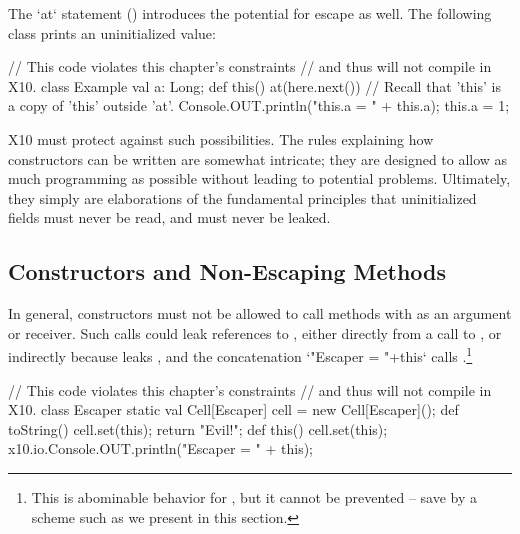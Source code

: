 The \xcd`at` statement () introduces the potential for
escape as well. The following class prints an uninitialized value: 
\begin{xten}
// This code violates this chapter's constraints
// and thus will not compile in X10.
class Example {
  val a: Long;
  def this() { 
    at(here.next()) {
      // Recall that 'this' is a copy of 'this' outside 'at'.
      Console.OUT.println("this.a = " + this.a);
    }
    this.a = 1;
  }
}
\end{xten}
%


X10 must protect against such possibilities.  The rules explaining how
constructors can be written are somewhat intricate; they are designed to allow
as much programming as possible without leading to potential problems.
Ultimately, they simply are elaborations of the fundamental principles that
uninitialized fields must never be read, and  must never be leaked.




\subsection{Constructors and Non-Escaping Methods}
\label{sect:nonescaping}

In general, constructors must not be allowed to call methods with  as
an argument or receiver. Such calls could leak references to ,
either directly from a call to , or indirectly because
 leaks , and the concatenation
\Xcd`"Escaper = "+this` calls .\footnote{This is abominable behavior for
, but it cannot be prevented -- save by a scheme such as we
present in this section.}
\begin{xten}
// This code violates this chapter's constraints
// and thus will not compile in X10.
class Escaper {
  static val Cell[Escaper] cell = new Cell[Escaper]();
  def toString() {
    cell.set(this);
    return "Evil!";
  }
  def this() {
    cell.set(this);
    x10.io.Console.OUT.println("Escaper = " + this);
  }
}
\end{xten}
%

